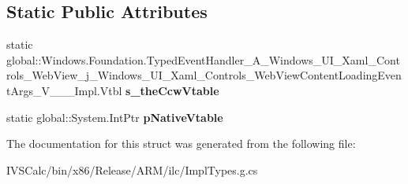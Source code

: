 \subsection*{Static Public Attributes}
\begin{DoxyCompactItemize}
\item 
\mbox{\label{struct_windows_1_1_foundation_1_1_typed_event_handler___a___windows___u_i___xaml___controls___we27d953ba581e9b4ad25b4f27fbd2d234_abd832ec5c0cee3af9af560abb42985fb}} 
static global\+::\+Windows.\+Foundation.\+Typed\+Event\+Handler\+\_\+\+A\+\_\+\+Windows\+\_\+\+U\+I\+\_\+\+Xaml\+\_\+\+Controls\+\_\+\+Web\+View\+\_\+j\+\_\+\+Windows\+\_\+\+U\+I\+\_\+\+Xaml\+\_\+\+Controls\+\_\+\+Web\+View\+Content\+Loading\+Event\+Args\+\_\+\+V\+\_\+\+\_\+\+\_\+\+Impl.\+Vtbl {\bfseries s\+\_\+the\+Ccw\+Vtable}
\item 
\mbox{\label{struct_windows_1_1_foundation_1_1_typed_event_handler___a___windows___u_i___xaml___controls___we27d953ba581e9b4ad25b4f27fbd2d234_ab91265d3f546c8f9e82e472aa091d2be}} 
static global\+::\+System.\+Int\+Ptr {\bfseries p\+Native\+Vtable}
\end{DoxyCompactItemize}


The documentation for this struct was generated from the following file\+:\begin{DoxyCompactItemize}
\item 
I\+V\+S\+Calc/bin/x86/\+Release/\+A\+R\+M/ilc/Impl\+Types.\+g.\+cs\end{DoxyCompactItemize}
